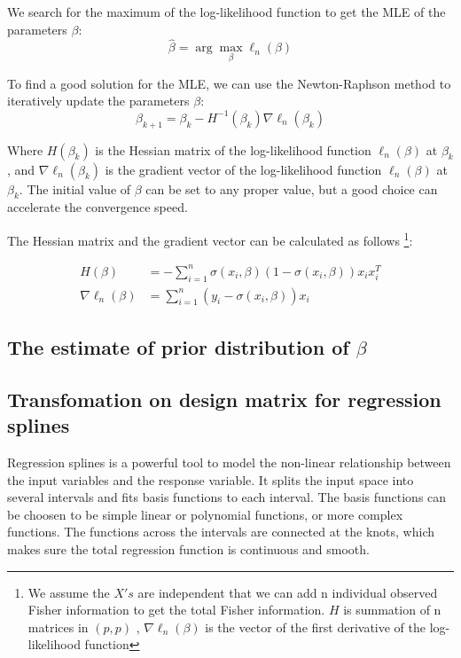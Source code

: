 
We search for the maximum of the log-likelihood function to get the MLE of the parameters \(\beta\):
\[
\hat{\beta} = \arg\max_{\beta} \ell_n(\beta)
\]

To find a good solution for the MLE, we can use the Newton-Raphson method to iteratively update the parameters \(\beta\):
\[
\beta_{k+1} = \beta_k - H^{-1}(\beta_k) \nabla \ell_n(\beta_k)
\]

Where \(H(\beta_k)\) is the Hessian matrix of the log-likelihood function \(\ell_n(\beta)\) at \(\beta_k\), 
and \(\nabla \ell_n(\beta_k)\) is the gradient vector of the log-likelihood function \(\ell_n(\beta)\) at \(\beta_k\).
The initial value of \(\beta\) can be set to any proper value, but a good choice can accelerate the convergence speed.

The Hessian matrix and the gradient vector can be calculated as follows
\footnote{We assume the \(X's\) are independent that we can add n individual observed 
Fisher information to get the total Fisher information. \(H\) is summation of n matrices in \((p, p)\) ,
$\nabla \ell_n(\beta)$ is the vector of the first derivative of the log-likelihood function}:

\begin{align*}
    H(\beta) & = -\sum_{i=1}^n \sigma(x_i, \beta)(1-\sigma(x_i, \beta))x_ix_i^T \\
    \nabla \ell_n(\beta) & = \sum_{i=1}^n (y_i - \sigma(x_i, \beta))x_i
\end{align*}

\subsection{The estimate of prior distribution of $\beta$}


\subsection{Transfomation on design matrix for regression splines}

Regression splines is a powerful tool to model the non-linear relationship 
between the input variables and the response variable. It splits the input space into 
several intervals and fits basis functions to each interval. The basis functions can 
be choosen to be simple linear or polynomial functions, or more complex functions. 
The functions across the intervals are connected at the knots, which makes sure 
the total regression function is continuous and smooth.

